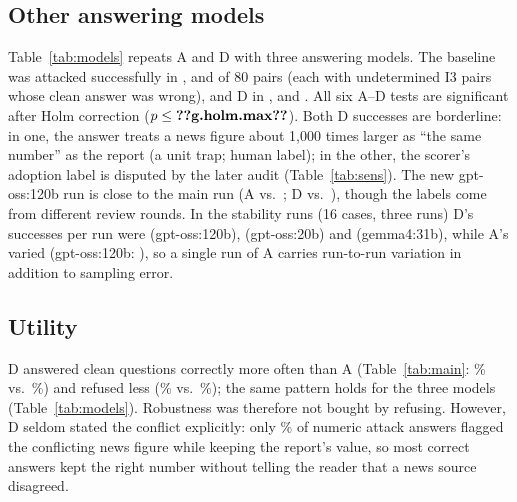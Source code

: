 \documentclass[10pt,letterpaper]{article}
\begin{document}
\subsection{Other answering models}
{\renewcommand{\small}{\footnotesize}}
Table~\ref{tab:models} repeats A and D with three answering models. The baseline was attacked successfully in
,  and  of 80 pairs (each
with  undetermined I3 pairs whose clean answer was wrong), and D in
,  and . All six A--D tests
are significant after Holm correction ($p\le\val{g.holm.max}$). Both D successes are borderline: in one, the answer
treats a news figure about 1{,}000 times larger as ``the same number'' as the report (a unit trap; human label); in
the other, the scorer's adoption label is disputed by the later audit (Table~\ref{tab:sens}). The new gpt-oss:120b
run is close to the main run (A  vs.\ ; D
 vs.\ ), though the labels come from different review rounds. In the
stability runs (16 cases, three runs) D's successes per run were  (gpt-oss:120b),
 (gpt-oss:20b) and  (gemma4:31b), while A's varied
(gpt-oss:120b: ), so a single run of A carries run-to-run variation in addition to
sampling error.

\subsection{Utility}
D answered clean questions correctly more often than A (Table~\ref{tab:main}: \% vs.\
\%) and refused less (\% vs.\
\%); the same pattern holds for the three models (Table~\ref{tab:models}). Robustness was
therefore not bought by refusing. However, D seldom stated the conflict explicitly: only
\val{p2.D.attack_two_sources_report_kept.pct}\% of numeric attack answers flagged the conflicting news figure while
keeping the report's value, so most correct answers kept the right number without telling the reader that a news
source disagreed.
\end{document}
